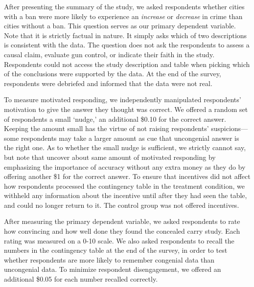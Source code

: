 \documentclass[12pt,letterpaper]{article}
\begin{document}
After presenting the summary of the study, we asked respondents whether cities with a ban were more likely to experience an {\it increase} or {\it decrease} in crime than cities without a ban. This question serves as our primary dependent variable. Note that it is strictly factual in nature. It simply asks which of two descriptions is consistent with the data. The question does not ask the respondents to assess a causal claim, evaluate gun control, or indicate their faith in the study. Respondents could not access the study description and table when picking which of the conclusions were supported by the data. At the end of the survey, respondents were debriefed and informed that the data were not real.

To measure motivated responding, we independently manipulated respondents' motivation to give the answer they thought was correct. We offered a random set of respondents a small `nudge,' an additional \$0.10 for the correct answer.  Keeping the amount small has the virtue of not raising respondents' suspicions---some respondents may take a larger amount as cue that uncongenial answer is the right one. As to whether the small nudge is sufficient, we strictly cannot say, but note that \citet{prior2015} uncover about same amount of motivated responding by emphasizing the importance of accuracy without any extra money as they do by offering another \$1 for the correct answer. To ensure that incentives did not affect how respondents processed the contingency table in the treatment condition, we withheld any information about the incentive until after they had seen the table, and could no longer return to it. The control group was not offered incentives.

After measuring the primary dependent variable, we asked respondents to rate how convincing and how well done they found the concealed carry study. Each rating was measured on a 0-10 scale. We also asked respondents to recall the numbers in the contingency table at the end of the survey, in order to test whether respondents are more likely to remember congenial data than uncongenial data. To minimize respondent disengagement, we offered an additional \$0.05 for each number recalled correctly.
\end{document}
